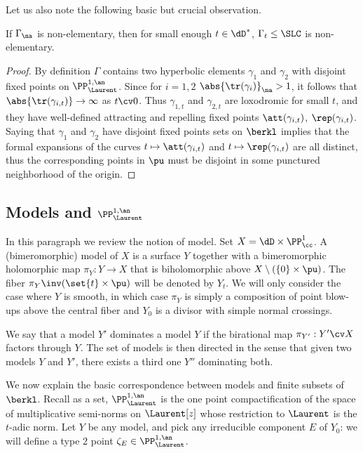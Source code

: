 Let us also note the following basic but crucial observation.

\begin{lemm}\label{lem:specialization NE}
If $\Gamma_\na$ is non-elementary, then for small enough $t\in \dD^*$, $\Gamma_t\leq \SLC$ is non-elementary.
\end{lemm}

\begin{proof}
By definition $\Gamma$ contains two hyperbolic elements $\gamma_1$ and $\gamma_2$ with disjoint fixed points on $\PP^{1,\an}_{\Laurent}$. Since for $i=1,2$ $\abs{\tr (\gamma_i)}_\na>1$, it follows that $\abs{\tr(\gamma_{i,t})} \to \infty$ as $t\cv 0$. Thus $\gamma_{1,t}$ and $\gamma_{2,t}$ are loxodromic for small $t$, and they have well-defined attracting and repelling fixed points $\att(\gamma_{i,t})$, $\rep(\gamma_{i,t})$. Saying that $\gamma_1$ and $\gamma_2$ have disjoint fixed points sets on $\berkl$ implies that the formal expansions of the curves $t\mapsto \att(\gamma_{i,t})$ and $t\mapsto \rep(\gamma_{i,t})$ are all distinct, thus the corresponding points in $\pu$ must be disjoint in some punctured neighborhood of the origin.
\end{proof}

\subsection{Models and \texorpdfstring{$\PP^{1,\an}_{\Laurent}$}{PP1, an Laurent}} \label{subs:models}

In this paragraph we review the notion of model. Set $X = \dD\times \PP^1_\cc$. A (bimeromorphic) model of $X$ is a surface $Y$ together with a bimeromorphic holomorphic map $\pi_Y:Y\to X$ that is biholomorphic above $X\setminus (\{0\}\times \pu)$. The fiber $\pi_Y\inv(\set{t}\times \pu)$ will be denoted by $Y_t$. We will only consider the case where $Y$ is smooth, in which case $\pi_Y$ is simply a composition of point blow-ups above the central fiber and $Y_0$ is a divisor with simple normal crossings.

We say that a model $Y'$ dominates a model $Y$ if the birational map $\pi_{Y'}:Y'\cv X$ factors through $Y$. The set of models is then directed in the sense that given two models $Y$ and $Y'$, there exists a third one $Y''$ dominating both.

We now explain the basic correspondence between models and finite subsets of $\berkl$. Recall as a set, $\PP^{1,\an}_{\Laurent}$ is the one point compactification of the space of multiplicative semi-norms on $\Laurent[z]$ whose restriction to $\Laurent$ is the $t$-adic norm. Let $Y$ be any model, and pick any irreducible component $E$ of $Y_0$: we will define a type 2 point $\zeta_E \in \PP^{1,\an}_{\Laurent}$.

